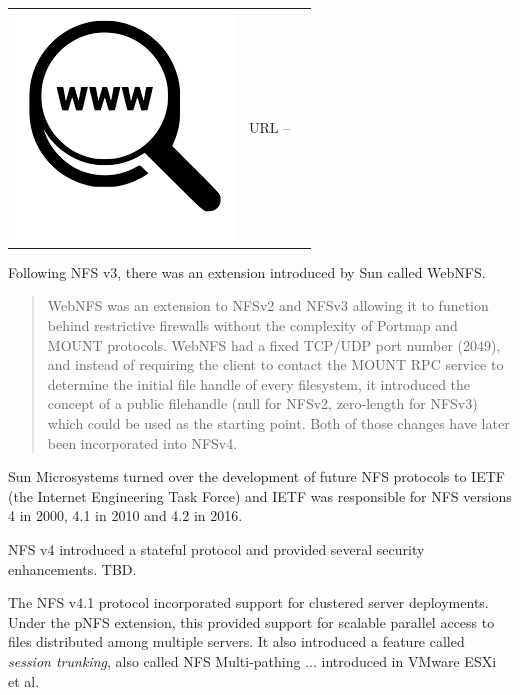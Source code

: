 \begin{table}[h]
\begin{tabular}{lcl}
\parbox[r]{0.5in}{\includegraphics[scale=0.15]{figures/url.png}} & \parbox[l]{0.55in}{URL  -- } & \parbox[l]{3in}{}
\end{tabular}
\end{table}

\noindent
Following NFS v3, there was an extension introduced by Sun called WebNFS.

\begin{quote}WebNFS was an extension to NFSv2 and NFSv3 allowing it to function behind restrictive firewalls without the complexity of Portmap and MOUNT protocols. WebNFS had a fixed TCP/UDP port number (2049), and instead of requiring the client to contact the MOUNT RPC service to determine the initial file handle of every filesystem, it introduced the concept of a public filehandle (null for NFSv2, zero-length for NFSv3) which could be used as the starting point. Both of those changes have later been incorporated into NFSv4.\end{quote}

Sun Microsystems turned over the development of future NFS protocols to IETF (the Internet Engineering Task Force) and IETF was responsible for NFS versions 4 in 2000, 4.1 in 2010 and 4.2 in 2016.

NFS v4 introduced a stateful protocol and provided several security enhancements. TBD.

The NFS v4.1 protocol incorporated support for clustered server deployments. Under the pNFS extension, this provided support for scalable parallel access to files distributed among multiple servers. It also introduced a feature called \textit{session trunking}, also called NFS Multi-pathing ... introduced in VMware ESXi et al.


